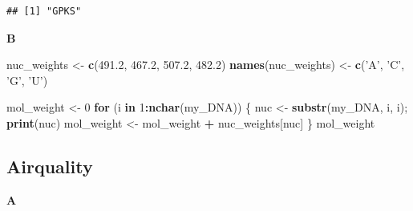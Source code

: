 \documentclass[]{book}
\newenvironment{Shaded}{\begin{snugshade}}{\end{snugshade}}
\newcommand{\ControlFlowTok}[1]{\textcolor[rgb]{0.13,0.29,0.53}{\textbf{#1}}}
\newcommand{\DataTypeTok}[1]{\textcolor[rgb]{0.13,0.29,0.53}{#1}}
\newcommand{\DecValTok}[1]{\textcolor[rgb]{0.00,0.00,0.81}{#1}}
\newcommand{\FloatTok}[1]{\textcolor[rgb]{0.00,0.00,0.81}{#1}}
\newcommand{\KeywordTok}[1]{\textcolor[rgb]{0.13,0.29,0.53}{\textbf{#1}}}
\newcommand{\NormalTok}[1]{#1}
\newcommand{\OperatorTok}[1]{\textcolor[rgb]{0.81,0.36,0.00}{\textbf{#1}}}
\newcommand{\StringTok}[1]{\textcolor[rgb]{0.31,0.60,0.02}{#1}}
\begin{document}
\begin{verbatim}
## [1] "GPKS"
\end{verbatim}

\textbf{B}

\begin{Shaded}
\begin{Highlighting}[]
\NormalTok{nuc_weights <-}\StringTok{ }\KeywordTok{c}\NormalTok{(}\FloatTok{491.2}\NormalTok{, }\FloatTok{467.2}\NormalTok{, }\FloatTok{507.2}\NormalTok{, }\FloatTok{482.2}\NormalTok{)}
\KeywordTok{names}\NormalTok{(nuc_weights) <-}\StringTok{ }\KeywordTok{c}\NormalTok{(}\StringTok{'A'}\NormalTok{, }\StringTok{'C'}\NormalTok{, }\StringTok{'G'}\NormalTok{, }\StringTok{'U'}\NormalTok{)}

\NormalTok{mol_weight <-}\StringTok{ }\DecValTok{0}
\ControlFlowTok{for}\NormalTok{ (i }\ControlFlowTok{in} \DecValTok{1}\OperatorTok{:}\KeywordTok{nchar}\NormalTok{(my_DNA)) \{}
\NormalTok{        nuc <-}\StringTok{ }\KeywordTok{substr}\NormalTok{(my_DNA, i, i);}
        \KeywordTok{print}\NormalTok{(nuc)}
\NormalTok{        mol_weight <-}\StringTok{ }\NormalTok{mol_weight }\OperatorTok{+}\StringTok{ }\NormalTok{nuc_weights[nuc]}
\NormalTok{\}}
\NormalTok{mol_weight}
\end{Highlighting}
\end{Shaded}

\hypertarget{airquality-1}{%
\subsection{Airquality}\label{airquality-1}}

\textbf{A}

\begin{Shaded}
\end{Shaded}
\end{document}
